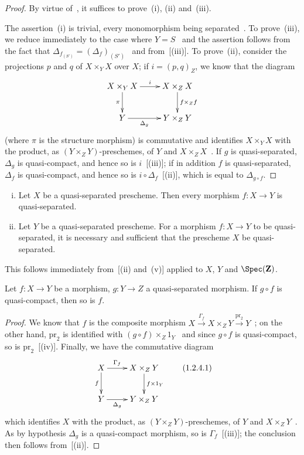 \begin{proof}
By virtue of~, it suffices to prove~(i), (ii) and~(iii).

The assertion~(i) is trivial, every monomorphism being separated~. To
prove~(iii), we reduce immediately to the case where $Y=S$~ and the assertion follows
from the fact that $\Delta_{f_{(S')}}=(\Delta_f)_{(S')}$~ and from~[(iii)]. To prove~(ii), consider
the projections $p$ and $q$ of $X\times_Y X$ over $X$; if $i=(p,q)_Z$, we know that the diagram
\[
\xymatrix{
  X\times_Y X \ar[r]^-{i} \ar[d]_-{\pi} & X\times_Z X \ar[d]^-{f\times_Z f} \\
  Y \ar[r]_-{\Delta_g} & Y\times_Z Y
}
\]
(where $\pi$ is the structure morphism) is commutative and identifies $X\times_Y X$ with the product,
as $(Y\times_Z Y)$-preschemes, of $Y$ and $X\times_Z X$~. If $g$ is
quasi-separated, $\Delta_g$ is quasi-compact, and hence so is $i$~[(iii)];
if in addition $f$ is quasi-separated, $\Delta_f$ is quasi-compact, and hence so is
$i\circ\Delta_f$~[(ii)], which is equal to $\Delta_{g\circ f}$.
\end{proof}

\begin{corollary}[1.2.3]
\label{IV.1.2.3}
\medskip\noindent
\begin{enumerate}[(i)]
  \item Let $X$ be a quasi-separated prescheme. Then every morphism $f:X\to Y$
    is quasi-separated.
  \item Let $Y$ be a quasi-separated prescheme. For a morphism $f:X\to Y$ to be quasi-separated,
    it is necessary and sufficient that the prescheme $X$ be quasi-separated.
\end{enumerate}
\end{corollary}

This follows immediately from~[(ii) and~(v)] applied to $X$, $Y$ and $\Spec(\mathbf{Z})$.

\begin{proposition}[1.2.4]
\label{IV.1.2.4}
Let $f:X\to Y$ be a morphism, $g:Y\to Z$ a quasi-separated morphism.
If $g\circ f$ is quasi-compact, then so is $f$.
\end{proposition}

\begin{proof}
We know that $f$ is the composite morphism $X\xrightarrow{\Gamma_f} X\times_Z Y\xrightarrow{\mathrm{pr}_2} Y$~; on the other hand,
$\mathrm{pr}_2$ is identified with $(g\circ f)\times_Z 1_Y$~ and since $g\circ f$ is quasi-compact, so is
$\mathrm{pr}_2$~[(iv)]. Finally, we have the commutative diagram
\[
\xymatrix{
  X \ar[r]^-{\Gamma_f} \ar[d]_-{f} & X\times_Z Y \ar[d]^-{f\times 1_Y} \\
  Y \ar[r]_-{\Delta_g} & Y\times_Z Y
}
\tag{1.2.4.1}
\]
which identifies $X$ with the product, as $(Y\times_Z Y)$-preschemes, of $Y$ and
$X\times_Z Y$~. As
by hypothesis $\Delta_g$ is a quasi-compact morphism, so is $\Gamma_f$~[(iii)];
the conclusion then follows from~[(ii)].
\end{proof}

